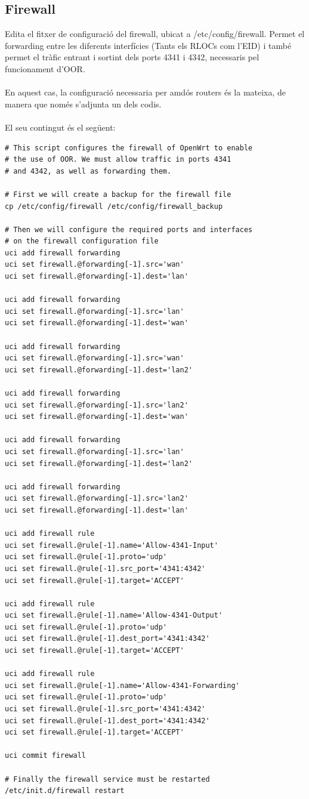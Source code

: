 \documentclass[11pt]{article}
\begin{document}
\subsection{Firewall}
Edita el fitxer de configuració del firewall, ubicat a /etc/config/firewall. Permet el forwarding entre les diferents interfícies (Tants els RLOCs com l’EID) i també permet el tràfic entrant i sortint dels ports 4341 i 4342, necessaris pel funcionament d’OOR.\\
\\
En aquest cas, la configuració necessaria per amdós routers és la mateixa, de manera que només s'adjunta un dels codis.\\
\\
El seu contingut és el següent:\\
\lstset{caption=Script de configuració del firewall}
\begin{lstlisting}[frame=single]
# This script configures the firewall of OpenWrt to enable
# the use of OOR. We must allow traffic in ports 4341 
# and 4342, as well as forwarding them.

# First we will create a backup for the firewall file
cp /etc/config/firewall /etc/config/firewall_backup

# Then we will configure the required ports and interfaces 
# on the firewall configuration file
uci add firewall forwarding
uci set firewall.@forwarding[-1].src='wan'
uci set firewall.@forwarding[-1].dest='lan'

uci add firewall forwarding
uci set firewall.@forwarding[-1].src='lan'
uci set firewall.@forwarding[-1].dest='wan'

uci add firewall forwarding
uci set firewall.@forwarding[-1].src='wan'
uci set firewall.@forwarding[-1].dest='lan2'

uci add firewall forwarding
uci set firewall.@forwarding[-1].src='lan2'
uci set firewall.@forwarding[-1].dest='wan'

uci add firewall forwarding
uci set firewall.@forwarding[-1].src='lan'
uci set firewall.@forwarding[-1].dest='lan2'

uci add firewall forwarding
uci set firewall.@forwarding[-1].src='lan2'
uci set firewall.@forwarding[-1].dest='lan'

uci add firewall rule
uci set firewall.@rule[-1].name='Allow-4341-Input'
uci set firewall.@rule[-1].proto='udp'
uci set firewall.@rule[-1].src_port='4341:4342'
uci set firewall.@rule[-1].target='ACCEPT'

uci add firewall rule
uci set firewall.@rule[-1].name='Allow-4341-Output'
uci set firewall.@rule[-1].proto='udp'
uci set firewall.@rule[-1].dest_port='4341:4342'
uci set firewall.@rule[-1].target='ACCEPT'

uci add firewall rule
uci set firewall.@rule[-1].name='Allow-4341-Forwarding'
uci set firewall.@rule[-1].proto='udp'
uci set firewall.@rule[-1].src_port='4341:4342'
uci set firewall.@rule[-1].dest_port='4341:4342'
uci set firewall.@rule[-1].target='ACCEPT'

uci commit firewall

# Finally the firewall service must be restarted
/etc/init.d/firewall restart
\end{lstlisting}
\end{document}
